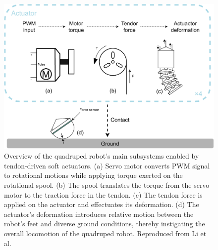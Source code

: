 \begin{figure}[ht]
    \centering
    \includegraphics[width=0.9\linewidth]{img/chap3/actuation.pdf}
    \caption{Overview of the quadruped robot’s main subsystems enabled by tendon-driven soft actuators. (a) Servo motor converts PWM signal to rotational motions while applying torque exerted on the rotational spool. (b) The spool translates the torque from the servo motor to the traction force in the tendon. (c) The tendon force is applied on the actuator and effectuates its deformation. (d) The actuator's deformation introduces relative motion between the robot's feet and diverse ground conditions, thereby instigating the overall locomotion of the quadruped robot. Reproduced from Li et al.\cite{jiSynthesizingOptimalGait2022, jiOmnidirectionalWalkingQuadruped2022}}
    \label{fig:actuation}
\end{figure}
